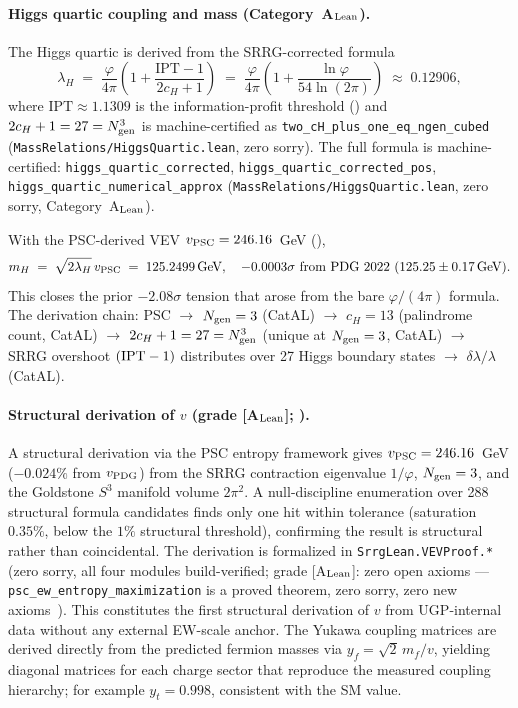 \documentclass[11pt]{article}
\theoremstyle{remark}
\begin{document}
\paragraph{Higgs quartic coupling and mass (Category~A$_{\rm Lean}$).}
\label{subsec:higgs}
The Higgs quartic is derived from the SRRG-corrected formula
\begin{equation}
\lambda_H \;=\; \frac{\varphi}{4\pi}\!\left(1 + \frac{\mathrm{IPT} - 1}{2c_H + 1}\right)
         \;=\; \frac{\varphi}{4\pi}\!\left(1 + \frac{\ln\varphi}{54\ln(2\pi)}\right) \;\approx\; 0.12906,
\label{eq:lambda_higgs}
\end{equation}
where $\mathrm{IPT}\approx 1.1309$ is the information-profit threshold (\cite{SpivackSRRG}) and
$2c_H + 1 = 27 = N_{\rm gen}^3$ is machine-certified as \texttt{two\_cH\_plus\_one\_eq\_ngen\_cubed}
(\texttt{MassRelations/HiggsQuartic.lean}, zero sorry).
The full formula is machine-certified: \texttt{higgs\_quartic\_corrected},
\texttt{higgs\_quartic\_corrected\_pos}, \texttt{higgs\_quartic\_numerical\_approx}
(\texttt{MassRelations/HiggsQuartic.lean}, zero sorry, Category~A$_{\rm Lean}$).

\noindent With the PSC-derived VEV $v_{\rm PSC} = 246.16$~GeV (\cite{SpivackSRRG}),
\begin{equation}
m_H \;=\; \sqrt{2\lambda_H}\,v_{\rm PSC} \;=\; 125.2499\,\text{GeV}, \quad -0.0003\sigma\text{ from PDG~2022 }(125.25\pm0.17\,\text{GeV}).
\label{eq:higgs_mass}
\end{equation}
This closes the prior $-2.08\sigma$ tension that arose from the bare $\varphi/(4\pi)$ formula.
The derivation chain: PSC $\to$ $N_{\rm gen}=3$ (CatAL) $\to$ $c_H=13$ (palindrome count, CatAL)
$\to$ $2c_H+1 = 27 = N_{\rm gen}^3$ (unique at $N_{\rm gen}=3$, CatAL) $\to$ SRRG overshoot
$({\rm IPT}-1)$ distributes over 27 Higgs boundary states $\to$ $\delta\lambda/\lambda$ (CatAL).

\paragraph{Structural derivation of $v$ (grade [A$_{\rm Lean}$]; \cite{SpivackSRRG}).}
A structural derivation via the PSC entropy framework gives
$v_{\rm PSC} = 246.16$~GeV ($-0.024\%$ from $v_{\rm PDG}$) from the
SRRG contraction eigenvalue $1/\varphi$, $N_{\rm gen}=3$, and the Goldstone $S^3$
manifold volume $2\pi^2$.
A null-discipline enumeration over 288 structural formula candidates finds only one
hit within tolerance (saturation $0.35\%$, below the $1\%$ structural threshold),
confirming the result is structural rather than coincidental.
The derivation is formalized in \texttt{SrrgLean.VEVProof.*} (zero sorry, all four
modules build-verified; grade [A$_{\rm Lean}$]: zero open axioms ---
\texttt{psc\_ew\_entropy\_maximization} is a proved theorem, zero sorry, zero new
axioms~\cite{SpivackSRRG}).
This constitutes the first structural derivation of $v$ from UGP-internal data
without any external EW-scale anchor.
The Yukawa coupling matrices are derived directly from the predicted fermion masses via $y_f = \sqrt{2}\, m_f / v$, yielding diagonal matrices for each charge sector that reproduce the measured coupling hierarchy; for example $y_t = 0.998$, consistent with the SM value.
\end{document}
